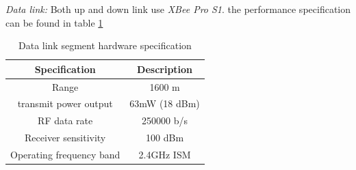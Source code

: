 \textit{Data link:}
Both up and down link use \textit{XBee Pro S1}. the performance specification can be found in table \ref{Table:XBee}
\begin{table}[H]
\centering
\begin{tabular}{|c|c|}
\hline
Specification           & Description   \\ \hline
Range                    & 1600 m        \\ \hline
transmit power output    & 63mW (18 dBm) \\ \hline
RF data rate             & 250000 b/s    \\ \hline
Receiver sensitivity     & 100 dBm       \\ \hline
Operating frequency band & 2.4GHz ISM    \\ \hline
\end{tabular}
\caption{Data link segment hardware specification}
\label{Table:XBee}
\end{table}

